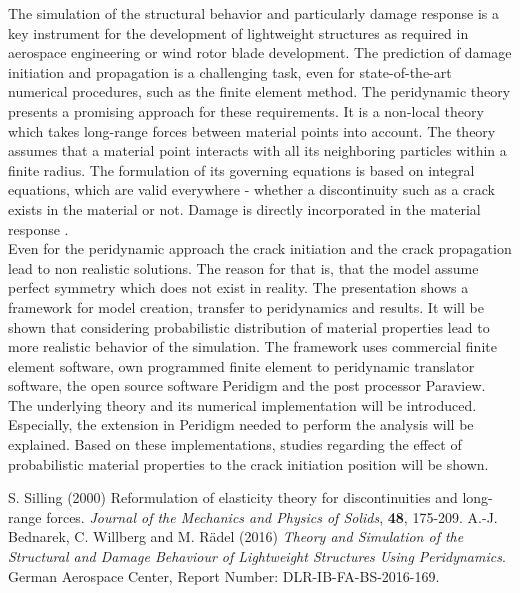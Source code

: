 \documentclass[12pt,a4paper]{article}
\begin{document}
\noindent
The simulation of the structural behavior and particularly damage response is a key
instrument for the development of lightweight structures as required in aerospace engineering
or wind rotor blade development. The prediction of damage initiation and
propagation is a challenging task, even for state-of-the-art numerical procedures, such as
the finite element method. The peridynamic theory presents a promising approach for
these requirements. It is a non-local theory which takes long-range forces between material
points into account. The theory assumes that a material point interacts with all
its neighboring particles within a finite radius. The formulation of its governing equations
is based on integral equations, which are valid everywhere - whether a discontinuity
such as a crack exists in the material or not. Damage is directly incorporated in the
material response \cite{SillingSA2000, BednarekAJ2016}. \\
Even for the peridynamic approach the crack initiation and the crack propagation lead to non realistic solutions. The reason for that is, that the model assume perfect symmetry which does not exist in reality. The presentation shows a framework for model creation, transfer to peridynamics and results. It will be shown that considering probabilistic distribution of material properties lead to more realistic behavior of the simulation. The framework uses commercial finite element software, own programmed finite element to peridynamic translator software, the open source software Peridigm and the post processor Paraview.
The underlying theory and its numerical implementation will be introduced. Especially, the extension in Peridigm needed to perform the analysis will be explained.  Based on these implementations, studies regarding the effect of probabilistic material properties to the crack initiation position will be shown.

\begin{thebibliography}{9}


 S. Silling (2000) Reformulation of elasticity theory for discontinuities and long-range forces. \textit{Journal of the Mechanics and Physics of Solids}, \textbf{48}, 175-209.
 A.-J. Bednarek, C. Willberg and M. R\"adel (2016) \textit{Theory and Simulation of the Structural and Damage Behaviour of Lightweight Structures Using Peridynamics}. German Aerospace Center, Report Number: DLR-IB-FA-BS-2016-169.

\end{thebibliography}
\end{document}
